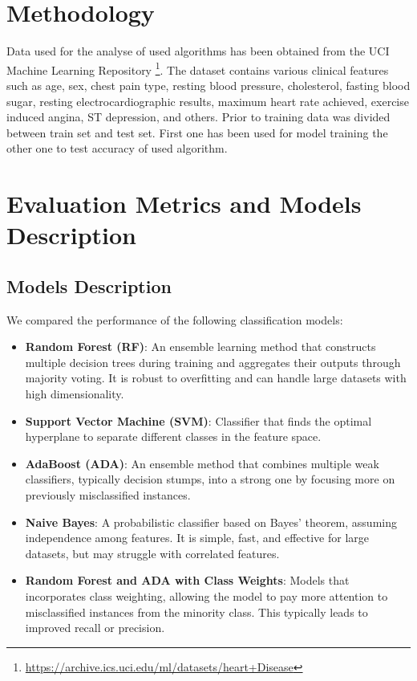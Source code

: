 \documentclass[conference]{IEEEtran}
\begin{document}
\section{Methodology}
Data used for the analyse of used algorithms has been 
obtained from the UCI Machine Learning Repository \footnote{\url{https://archive.ics.uci.edu/ml/datasets/heart+Disease}}.
The dataset contains various clinical features such as age, sex, chest pain type,
resting blood pressure, cholesterol, fasting blood sugar,
resting electrocardiographic results, maximum heart rate achieved,
exercise induced angina, ST depression, and others. Prior to training
data was divided between train set and test set. First one has been used
for model training the other one to test accuracy of used algorithm.

\section{Evaluation Metrics and Models Description}
\subsection{Models Description}
We compared the performance of the following classification models:
\begin{itemize}
    \item \textbf{Random Forest (RF)}: An ensemble learning method that constructs multiple decision trees during training and aggregates their outputs through majority voting. It is robust to overfitting and can handle large datasets with high dimensionality.
    \item \textbf{Support Vector Machine (SVM)}: Classifier that finds the optimal hyperplane to separate different classes in the feature space.
    \item \textbf{AdaBoost (ADA)}: An ensemble method that combines multiple weak classifiers, typically decision stumps, into a strong one by focusing more on previously misclassified instances.
    \item \textbf{Naive Bayes}: A probabilistic classifier based on Bayes' theorem, assuming independence among features. It is simple, fast, and effective for large datasets, but may struggle with correlated features.
    \item \textbf{Random Forest and ADA with Class Weights}: Models that incorporates class weighting, allowing the model to pay more attention to misclassified instances from the minority class. This typically leads to improved recall or precision.
\end{itemize}
\end{document}
